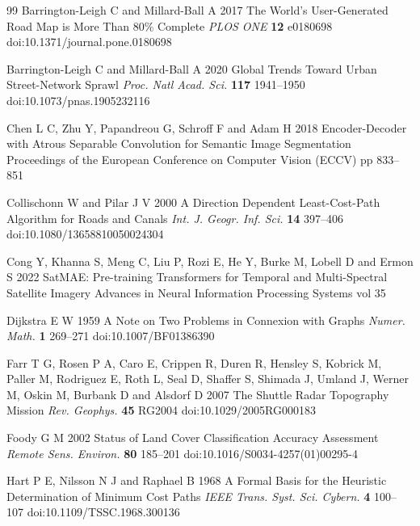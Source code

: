 \begin{thebibliography}{99}
\providecommand{\url}[1]{\texttt{#1}}
 Barrington-Leigh C and Millard-Ball A 2017 The World's User-Generated Road Map is More Than 80\% Complete {\it PLOS ONE} {\bf 12} e0180698 doi:10.1371/journal.pone.0180698

 Barrington-Leigh C and Millard-Ball A 2020 Global Trends Toward Urban Street-Network Sprawl {\it Proc. Natl Acad. Sci.} {\bf 117} 1941--1950 doi:10.1073/pnas.1905232116

 Chen L C, Zhu Y, Papandreou G, Schroff F and Adam H 2018 Encoder-Decoder with Atrous Separable Convolution for Semantic Image Segmentation Proceedings of the European Conference on Computer Vision (ECCV) pp 833--851

 Collischonn W and Pilar J V 2000 A Direction Dependent Least-Cost-Path Algorithm for Roads and Canals {\it Int. J. Geogr. Inf. Sci.} {\bf 14} 397--406 doi:10.1080/13658810050024304

 Cong Y, Khanna S, Meng C, Liu P, Rozi E, He Y, Burke M, Lobell D and Ermon S 2022 {SatMAE}: Pre-training Transformers for Temporal and Multi-Spectral Satellite Imagery Advances in Neural Information Processing Systems vol 35

 Dijkstra E W 1959 A Note on Two Problems in Connexion with Graphs {\it Numer. Math.} {\bf 1} 269--271 doi:10.1007/BF01386390

 Farr T G, Rosen P A, Caro E, Crippen R, Duren R, Hensley S, Kobrick M, Paller M, Rodriguez E, Roth L, Seal D, Shaffer S, Shimada J, Umland J, Werner M, Oskin M, Burbank D and Alsdorf D 2007 The Shuttle Radar Topography Mission {\it Rev. Geophys.} {\bf 45} RG2004 doi:10.1029/2005RG000183

 Foody G M 2002 Status of Land Cover Classification Accuracy Assessment {\it Remote Sens. Environ.} {\bf 80} 185--201 doi:10.1016/S0034-4257(01)00295-4

 Hart P E, Nilsson N J and Raphael B 1968 A Formal Basis for the Heuristic Determination of Minimum Cost Paths {\it IEEE Trans. Syst. Sci. Cybern.} {\bf 4} 100--107 doi:10.1109/TSSC.1968.300136


\end{thebibliography}
